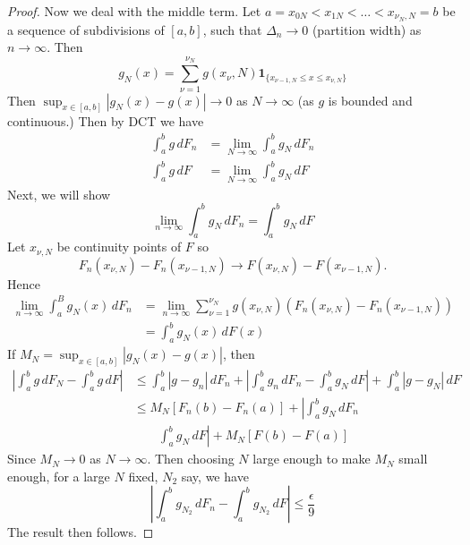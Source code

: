 \documentclass[10pt, oneside, reqno]{amsart}
\theoremstyle{plain}%
\theoremstyle{definition}
\theoremstyle{remark}
\newcommand{\indic}[1]{\mathbf{1}_{\{ #1 \}} }
\begin{document}
\begin{proof}
    Now we deal with the middle term.  Let $a = x_{0N} < x_{1N} < \dots < x_{\nu_N, N} = b$ be a sequence of subdivisions of $[a,b]$, such that $\Delta_{n} \rightarrow 0$ (partition width) as $n \rightarrow \infty$.  Then \[
        g_N(x) = \sum_{\nu = 1}^{\nu_N} g(x_{\nu}, N) \indic{x_{\nu-1, N} \leq x \leq x_{\nu, N}} 
    \]  Then $\sup_{x \in [a,b]} | g_N(x) - g(x)| \rightarrow 0$ as $N \rightarrow \infty$ (as $g$ is bounded and continuous.) Then by DCT we have 
    \begin{align*}
        \int_a^b g \, dF_n &= \lim_{N \rightarrow \infty} \int_a^b g_N \, dF_n \\
        \int_a^b g \, dF &= \lim_{N \rightarrow \infty} \int_a^b g_N \, dF
    \end{align*}   Next, we will show \[
        \lim_{ n \rightarrow \infty} \int_a^b g_N \, dF_n = \int_a^b g_N \, dF
    \]  Let $x_{\nu, N}$ be continuity points of $F$ so \[
        F_n(x_{\nu, N}) - F_n(x_{\nu - 1, N}) \rightarrow F(x_{\nu, N}) - F(x_{\nu - 1, N}).
    \] Hence
    \begin{align*}
        \lim_{n \rightarrow \infty} \int_a^B g_N(x) \, dF_n &= \lim_{n \rightarrow \infty} \sum_{\nu = 1}^{\nu_N} g(x_{\nu, N}) (F_n(x_{\nu, N}) - F_n(x_{\nu - 1, N})) \\
        &= \int_a^b g_N(x) \, dF(x) 
    \end{align*} If $M_N = \sup_{x \in [a,b]} | g_N(x) - g(x) |$, then \begin{align*}
        \left| \int_a^b g \, dF_N - \int_a^b g \, dF \right| &\leq \int_a^b |g - g_n | \, dF_n + \left| \int_a^b g_n \, dF_n - \int_a^b g_N \, dF \right| + \int_a^b |g - g_N | \, dF \\
        &\leq M_N [ F_n(b) - F_n(a)] + \left| \int_a^b g_N \, dF_n  \right.\\
        &\qquad \left. \int_a^b g_N \, dF \right| + M_N[F(b) - F(a)] 
    \end{align*} Since $M_N \rightarrow 0$ as $N \rightarrow \infty$.  Then choosing $N$ large enough to make $M_N$ small enough, for a large $N$ fixed, $N_2$ say, we have \[
        \left| \int_a^b g_{N_2} \, dF_n - \int_a^b g_{N_2} \, dF \right| \leq \frac{\epsilon}{9}
    \]  The result then follows.
\end{proof}  
\end{document}
